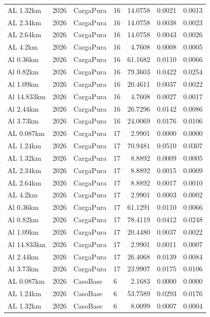 \documentclass[11pt,a4paper]{article}
\begin{document}
\begin{longtable}{llllrrr}
AL 1.32km & 2026 & CargaPura & 16 & 14.0758 & 0.0021 & 0.0013 \\
AL 2.34km & 2026 & CargaPura & 16 & 14.0758 & 0.0038 & 0.0023 \\
AL 2.64km & 2026 & CargaPura & 16 & 14.0758 & 0.0043 & 0.0026 \\
AL 4.2km & 2026 & CargaPura & 16 & 4.7608 & 0.0008 & 0.0005 \\
Al 0.36km & 2026 & CargaPura & 16 & 61.1682 & 0.0110 & 0.0066 \\
Al 0.82km & 2026 & CargaPura & 16 & 79.3603 & 0.0422 & 0.0254 \\
Al 1.09km & 2026 & CargaPura & 16 & 20.4611 & 0.0037 & 0.0022 \\
Al 14.833km & 2026 & CargaPura & 16 & 4.7608 & 0.0027 & 0.0017 \\
Al 2.44km & 2026 & CargaPura & 16 & 26.7296 & 0.0142 & 0.0086 \\
Al 3.73km & 2026 & CargaPura & 16 & 24.0069 & 0.0176 & 0.0106 \\
AL 0.087km & 2026 & CargaPura & 17 & 2.9901 & 0.0000 & 0.0000 \\
AL 1.24km & 2026 & CargaPura & 17 & 70.9481 & 0.0510 & 0.0307 \\
AL 1.32km & 2026 & CargaPura & 17 & 8.8892 & 0.0009 & 0.0005 \\
AL 2.34km & 2026 & CargaPura & 17 & 8.8892 & 0.0015 & 0.0009 \\
AL 2.64km & 2026 & CargaPura & 17 & 8.8892 & 0.0017 & 0.0010 \\
AL 4.2km & 2026 & CargaPura & 17 & 2.9901 & 0.0003 & 0.0002 \\
Al 0.36km & 2026 & CargaPura & 17 & 61.1291 & 0.0110 & 0.0066 \\
Al 0.82km & 2026 & CargaPura & 17 & 78.4119 & 0.0412 & 0.0248 \\
Al 1.09km & 2026 & CargaPura & 17 & 20.4480 & 0.0037 & 0.0022 \\
Al 14.833km & 2026 & CargaPura & 17 & 2.9901 & 0.0011 & 0.0007 \\
Al 2.44km & 2026 & CargaPura & 17 & 26.4068 & 0.0139 & 0.0084 \\
Al 3.73km & 2026 & CargaPura & 17 & 23.9907 & 0.0175 & 0.0106 \\
AL 0.087km & 2026 & CasoBase & 6 & 2.1683 & 0.0000 & 0.0000 \\
AL 1.24km & 2026 & CasoBase & 6 & 53.7589 & 0.0293 & 0.0176 \\
AL 1.32km & 2026 & CasoBase & 6 & 8.0099 & 0.0007 & 0.0004 \\

\end{longtable}
\end{document}
